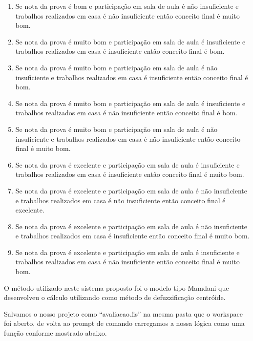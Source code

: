 \documentclass{article}
\begin{document}
\begin{enumerate}
	\item Se nota da prova é bom e participação em sala de aula é não
		insuficiente e trabalhos realizados em casa é não insuficiente
		então conceito final é muito bom.

	\item Se nota da prova é muito bom e participação em sala de aula
		é insuficiente e trabalhos realizados em casa é insuficiente
		então conceito final é bom.

	\item Se nota da prova é muito bom e participação em sala de aula
		é não insuficiente e trabalhos realizados em casa é
		insuficiente então conceito final é bom.

	\item Se nota da prova é muito bom e participação em sala de aula
		é insuficiente e trabalhos realizados em casa é não
		insuficiente então conceito final é bom.

	\item Se nota da prova é muito bom e participação em sala de aula
		é não insuficiente e trabalhos realizados em casa é não
		insuficiente então conceito final é muito bom.

	\item Se nota da prova é excelente e participação em sala de aula
		é insuficiente e trabalhos realizados em casa é insuficiente
		então conceito final é muito bom.

	\item Se nota da prova é excelente e participação em sala de aula
		é não insuficiente e trabalhos realizados em casa é não
		insuficiente então conceito final é excelente.

	\item Se nota da prova é excelente e participação em sala de aula
		é não insuficiente e trabalhos realizados em casa é
		insuficiente então conceito final é muito bom.

	\item Se nota da prova é excelente e participação em sala de aula
		é insuficiente e trabalhos realizados em casa é não
		insuficiente então conceito final é muito bom.

\end{enumerate}

O método utilizado neste sistema proposto foi o modelo tipo
Mamdani que desenvolveu o cálculo utilizando como método de
defuzzificação centróide.

Salvamos o nosso projeto como ``avaliacao.fis'' na mesma pasta
que o workspace foi aberto, de volta ao prompt de comando
carregamos a nossa lógica como uma função conforme mostrado
abaixo.
\end{document}
